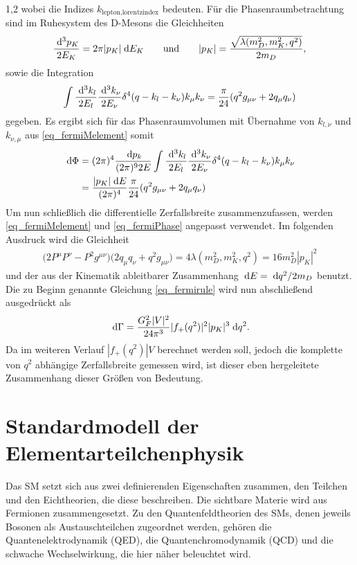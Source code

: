 \documentclass[11pt,a4paper,twoside]{report}
\begin{document}
\begin{spacing}{1,2}
wobei die Indizes $k_{\text{lepton},\text{lorentzindex}}$ bedeuten. Für die Phasenraumbetrachtung sind im Ruhesystem des D-Mesons die Gleichheiten
\begin{align}
 \frac{\; \mathrm{d}^3 p_K}{2E_K} = 2\pi |p_K| \; \mathrm{d} E_K \qquad \text{und} \qquad |p_K| = \frac{\sqrt{\lambda(m_D^2,m_K^2,q^2)}}{2m_D},
\end{align}
sowie die Integration
\begin{align}
 \int \frac{\; \mathrm{d}^3k_l}{2E_l}\frac{\; \mathrm{d}^3k_\nu}{2E_\nu}\delta^4(q-k_l-k_\nu)k_\mu k_\nu = \frac{\pi}{24}(q^2 g_{\mu\nu} + 2 q_\mu q_\nu)
\end{align}
gegeben. Es ergibt sich für das Phasenraumvolumen mit Übernahme von $k_{l,\nu}$ und $k_{\nu,\mu}$ aus \eqref{eq_fermiMelement} somit
\begin{align}
 \; \mathrm{d} \Phi &= (2\pi)^4 \frac{\; \mathrm{d} p_k}{(2\pi)^9 2E} \int \frac{\; \mathrm{d}^3k_l}{2E_l}\frac{\; \mathrm{d}^3k_\nu}{2E_\nu}\delta^4(q-k_l-k_\nu)k_\mu k_\nu \nonumber\\
 &= \frac{|p_K| \; \mathrm{d} E}{(2\pi)^4}\frac{\pi}{24}(q^2g_{\mu\nu} + 2 q_\mu q_\nu)
 \label{eq_fermiPhase}
\end{align}
Um nun schließlich die differentielle Zerfallsbreite zusammenzufassen, werden \eqref{eq_fermiMelement} und \eqref{eq_fermiPhase} angepasst verwendet. Im
folgenden Ausdruck wird die Gleichheit
\begin{align}
 \big(2P^\mu P^\nu - P^2 g^{\mu\nu}\big)\big(2q_\mu q_\nu + q^2g_{\mu\nu}) = 4 \lambda(m_D^2,m_K^2,q^2) = 16 m_D^2 |p_K|^2
\end{align}
und der aus der Kinematik ableitbarer Zusammenhang $\; \mathrm{d} E = \; \mathrm{d} q^2 / 2m_D$ benutzt. Die zu Beginn genannte Gleichung \eqref{eq_fermirule} wird 
nun abschließend ausgedrückt als
\begin{align}
 \; \mathrm{d} \Gamma = \frac{G_F^2|V|^2}{24\pi^3} |f_+(q^2)|^2 |p_K|^3 \; \mathrm{d} q^2.
 \label{eq_fermidGammafinal}
\end{align}
Da im weiteren Verlauf $|f_+(q^2)|V$ berechnet werden soll, jedoch die komplette von $q^2$ abhängige Zerfallsbreite gemessen wird, ist dieser eben hergeleitete
Zusammenhang dieser Größen von Bedeutung.

\section{Standardmodell der Elementarteilchenphysik}
Das SM setzt sich aus zwei definierenden Eigenschaften zusammen, den Teilchen und den Eichtheorien, die diese beschreiben. Die sichtbare Materie wird 
aus Fermionen zusammengesetzt. Zu den Quantenfeldtheorien des SMs, denen jeweils Bosonen als Austauschteilchen zugeordnet werden, gehören die 
Quantenelektrodynamik (QED), die Quantenchromodynamik (QCD) und die schwache Wechselwirkung, die hier näher beleuchtet wird. 


\end{spacing}
\end{document}

